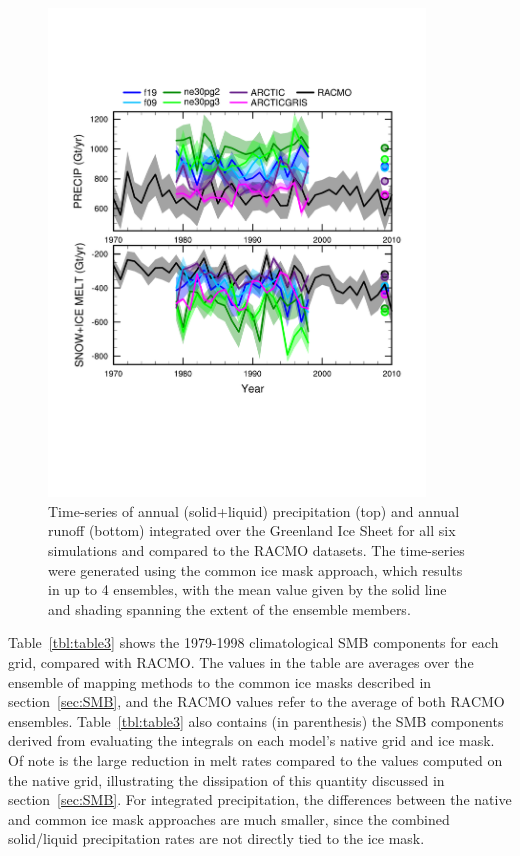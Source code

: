 \documentclass[draft]{agujournal2019}
\begin{document}
\begin{figure}[t]
\begin{center}
         \includegraphics[width=100mm]{temp_tseries_GRIS.pdf}
\end{center}
\caption{Time-series of annual (solid+liquid) precipitation (top) and annual runoff (bottom) integrated over the Greenland Ice Sheet for all six simulations and compared to the RACMO datasets. The time-series were generated using the common ice mask approach, which results in up to 4 ensembles, with the mean value given by the solid line and shading spanning the extent of the ensemble members.}
\label{fig:tseries}
\end{figure}

Table~\ref{tbl:table3} shows the 1979-1998 climatological SMB components for each grid, compared with RACMO. The values in the table are averages over the ensemble of mapping methods to the common ice masks described in section~\ref{sec:SMB}, and the RACMO values refer to the average of both RACMO ensembles. Table~\ref{tbl:table3} also contains (in parenthesis) the SMB components derived from evaluating the integrals on each model's native grid and ice mask. Of note is the large reduction in melt rates compared to the values computed on the native grid, illustrating the dissipation of this quantity discussed in section~\ref{sec:SMB}. For integrated precipitation, the differences between the native and common ice mask approaches are much smaller, since the combined solid/liquid precipitation rates are not directly tied to the ice mask.
\end{document}
